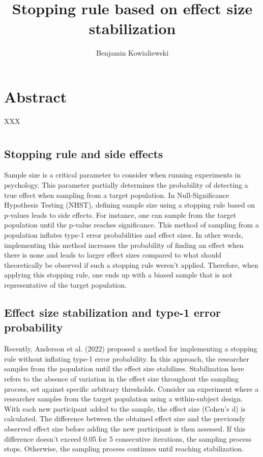 \documentclass[12pt]{article}
\title{Stopping rule based on effect size stabilization}
\author{Benjamin Kowialiewski}
\begin{document}
    \linenumbers

    \maketitle

    \newpage

    \section{Abstract}
    XXX

    \newpage
    \section{}

    \subsection{Stopping rule and side effects}
    Sample size is a critical parameter to consider when running experiments in psychology. This parameter partially determines the probability of detecting a true effect when sampling from a target population. In Null-Significance Hypothesis Testing (NHST), defining sample size using a stopping rule based on p-values leads to side effects. For instance, one can sample from the target population until the p-value reaches significance. This method of sampling from a population inflates type-1 error probabilities and effect sizes. In other words, implementing this method increases the probability of finding an effect when there is none and leads to larger effect sizes compared to what should theoretically be observed if such a stopping rule weren't applied. Therefore, when applying this stopping rule, one ends up with a biased sample that is not representative of the target population.

    \subsection{Effect size stabilization and type-1 error probability}
    Recently, Anderson et al. (2022) proposed a method for implementing a stopping rule without inflating type-1 error probability. In this approach, the researcher samples from the population until the effect size stabilizes. Stabilization here refers to the absence of variation in the effect size throughout the sampling process, set against specific arbitrary thresholds. Consider an experiment where a researcher samples from the target population using a within-subject design. With each new participant added to the sample, the effect size (Cohen's d) is calculated. The difference between the obtained effect size and the previously observed effect size before adding the new participant is then assessed. If this difference doesn't exceed 0.05 for 5 consecutive iterations, the sampling process stops. Otherwise, the sampling process continues until reaching stabilization.
\end{document}
